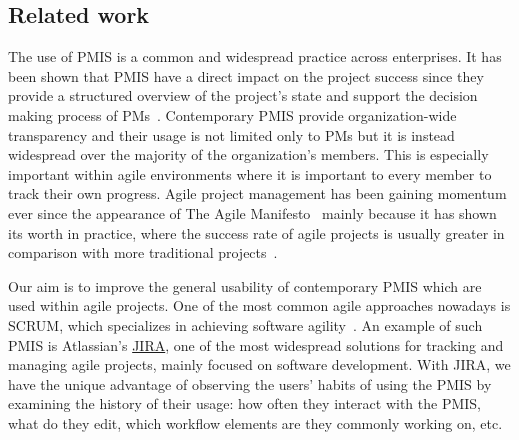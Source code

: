 \documentclass[a4paper, 12pt]{article}
\begin{document}


\subsection{Related work}



The use of PMIS is a common and widespread practice across enterprises. It has been shown that PMIS have a direct impact on the project success since they provide a structured overview of the project's state and support the decision making process of PMs~\cite{RAYMOND2008213}. Contemporary PMIS provide organization-wide transparency and their usage is not limited only to PMs but it is instead widespread over the majority of the organization's members. This is especially important within agile environments where it is important to every member to track their own progress. Agile project management has been gaining momentum ever since the appearance of The Agile Manifesto~\cite{alliance2001agile} mainly because it has shown its worth in practice, where the success rate of agile projects is usually greater in comparison with more traditional projects~\cite{SERRADOR20151040}.

Our aim is to improve the general usability of contemporary PMIS which are used within agile projects. One of the most common agile approaches nowadays is SCRUM, which specializes in achieving software agility~\cite{sutherland2013scrum}. An example of such PMIS is Atlassian's \href{https://www.atlassian.com/software/jira}{JIRA}, one of the most widespread solutions for tracking and managing agile projects, mainly focused on software development. With JIRA, we have the unique advantage of observing the users' habits of using the PMIS by examining the history of their usage: how often they interact with the PMIS, what do they edit, which workflow elements are they commonly working on, etc.
\end{document}
